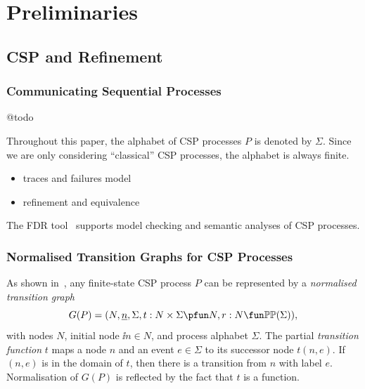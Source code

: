 \section{Preliminaries}
\label{section:preliminaries}



\subsection{CSP and Refinement}


\subsubsection*{Communicating Sequential Processes} @todo

Throughout this paper, the alphabet of CSP processes $P$ is denoted by $\Sigma$.
Since we are only considering ``classical'' CSP processes, the alphabet is always finite.

\begin{itemize}
  \item traces and failures model
  \item refinement and equivalence
\end{itemize}

The FDR tool~\cite{fdr} supports model checking and semantic analyses of CSP
processes.

\subsubsection*{Normalised Transition Graphs for CSP Processes}
\label{sec:ntg}

As shown in~\cite{Roscoe:1994:CME:197600}, any finite-state CSP process $P$
can be represented by a \emph{normalised transition graph}
$$
G(P) = ( N, \ii n, \Sigma, t : N\times\Sigma \pfun N, r : N \fun \mathbb{P}\mathbb{P}(\Sigma)),
$$
with nodes $N$, initial node $\ii n\in N$, and process alphabet $\Sigma$. The
partial \emph{transition function} $t$ maps a node $n$ and an event
$e\in\Sigma$ to its successor node $t(n,e)$. If $(n,e)$ is in the domain of
$t$, then there is a transition from $n$ with label $e$. Normalisation of
$G(P)$ is reflected by the fact that $t$ is a function.

